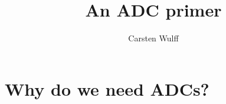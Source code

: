 \documentclass{article}
\begin{document}

\title{An ADC primer}
\author{Carsten Wulff}
\maketitle
\tableofcontents
\newpage
\section{Why do we need ADCs?}


\end{document}
